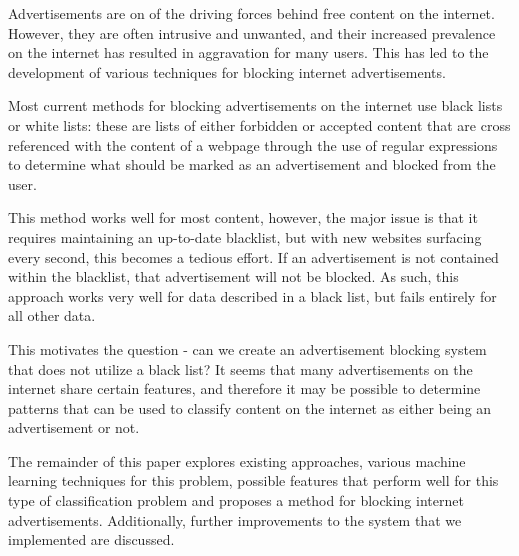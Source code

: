 Advertisements are on of the driving forces behind free content on the internet. However, they are often intrusive and unwanted, and their increased prevalence on the internet has resulted in aggravation for many users. This has led to the development of various techniques for blocking internet advertisements. 

Most current methods for blocking advertisements on the internet use black lists or white lists: these are lists of either forbidden or accepted content that are cross referenced with the content of a webpage through the use of regular expressions to determine what should be marked as an advertisement and blocked from the user. 

This method works well for most content, however, the major issue is that it requires maintaining an up-to-date blacklist, but with new websites surfacing every second, this becomes a tedious effort.  If an advertisement is not contained within the blacklist, that advertisement will not be blocked. As such, this approach works very well for data described in a black list, but fails entirely for all other data.

This motivates the question - can we create an advertisement blocking system that does not utilize a black list? It seems that many advertisements on the internet share certain features, and therefore it may be possible to determine patterns that can be used to classify content on the internet as either being an advertisement or not.

The remainder of this paper explores existing approaches, various machine learning techniques for this problem, possible features that perform well for this type of classification problem and proposes a method for blocking internet advertisements. Additionally, further improvements to the system that we implemented are discussed.